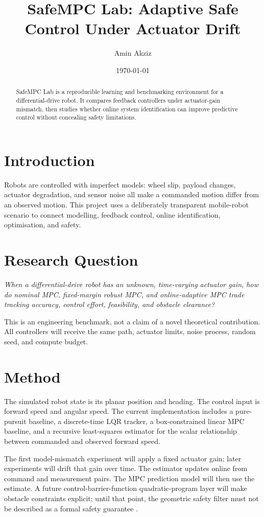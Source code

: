 \documentclass[11pt,a4paper]{article}
\title{SafeMPC Lab: Adaptive Safe Control Under Actuator Drift}
\author{Amin Akziz}
\date{\today}
\begin{document}
\maketitle

\begin{abstract}
SafeMPC Lab is a reproducible learning and benchmarking environment for a differential-drive robot. It compares feedback controllers under actuator-gain mismatch, then studies whether online system identification can improve predictive control without concealing safety limitations.
\end{abstract}

\section{Introduction}
Robots are controlled with imperfect models: wheel slip, payload changes, actuator degradation, and sensor noise all make a commanded motion differ from an observed motion. This project uses a deliberately transparent mobile-robot scenario to connect modelling, feedback control, online identification, optimisation, and safety.

\section{Research Question}
\textit{When a differential-drive robot has an unknown, time-varying actuator gain, how do nominal MPC, fixed-margin robust MPC, and online-adaptive MPC trade tracking accuracy, control effort, feasibility, and obstacle clearance?}

This is an engineering benchmark, not a claim of a novel theoretical contribution. All controllers will receive the same path, actuator limits, noise process, random seed, and compute budget.

\section{Method}
The simulated robot state is its planar position and heading. The control input is forward speed and angular speed. The current implementation includes a pure-pursuit baseline, a discrete-time LQR tracker, a box-constrained linear MPC baseline, and a recursive least-squares estimator for the scalar relationship between commanded and observed forward speed.

The first model-mismatch experiment will apply a fixed actuator gain; later experiments will drift that gain over time. The estimator updates online from command and measurement pairs. The MPC prediction model will then use the estimate. A future control-barrier-function quadratic-program layer will make obstacle constraints explicit; until that point, the geometric safety filter must not be described as a formal safety guarantee \cite{ames2017cbf}.
\end{document}
